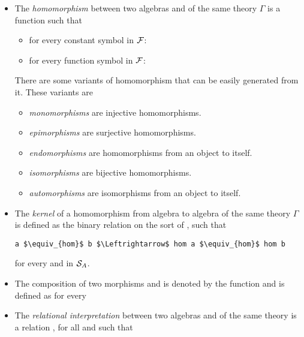 \begin{itemize}
\begin{itemize}
    \end{itemize}
    \item The \emph{homomorphism} between two algebras  and  of the same theory $\Gamma$ is a function  such that 
    \begin{itemize}
        \item for every constant symbol  in $\mathcal{F}$:  
        \item for every function symbol  in $\mathcal{F}$: \newline 
           \-\hspace{2em} 
    \end{itemize}
    There are some variants of homomorphism that can be easily generated from it. These variants are  
    \begin{itemize}
    	\item \emph{monomorphisms} are injective homomorphisms. 
  	  	\item \emph{epimorphisms} are surjective homomorphisms. 
    	\item \emph{endomorphisms} are homomorphisms from an object to itself. 
    	\item \emph{isomorphisms} are bijective homomorphisms. 
    	\item \emph{automorphisms} are isomorphisms from an object to itself. 
    \end{itemize}
    \item The \emph{kernel} of a homomorphism from algebra  to algebra  of the same theory $\Gamma$ is defined as the binary relation  on the sort of , such that 
    \begin{lstlisting}[mathescape] 
    a $\equiv_{hom}$ b $\Leftrightarrow$ hom a $\equiv_{hom}$ hom b
    \end{lstlisting}
    for every  and  in $\mathcal{S}_A$. 
    \item The composition of two morphisms  and  is denoted by the function  and is defined as 
     for every    
    \item The \emph{relational interpretation} between two algebras  and  of the same theory is a relation , for all  and  such that 

\end{itemize}
